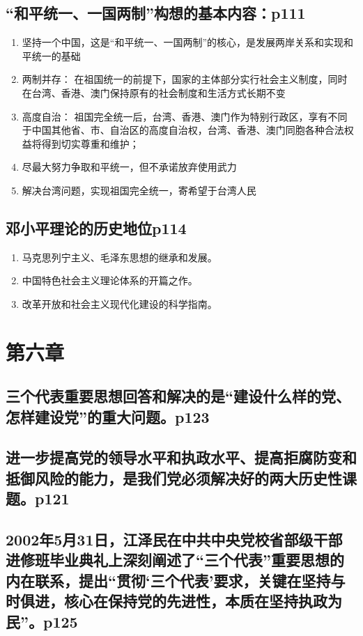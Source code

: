 \documentclass[UTF8]{ctexart}
\begin{document}
\subsection{“和平统一、一国两制”构想的基本内容：p111}
\begin{enumerate}[(1)]
    \item 坚持一个中国，这是“和平统一、一国两制”的核心，是发展两岸关系和实现和平统一的基础
    \item 两制并存： 在祖国统一的前提下，国家的主体部分实行社会主义制度，同时在台湾、香港、澳门保持原有的社会制度和生活方式长期不变
    \item 高度自治： 祖国完全统一后，台湾、香港、澳门作为特别行政区，享有不同于中国其他省、市、自治区的高度自治权，台湾、香港、澳门同胞各种合法权益将得到切实尊重和维护； 
    \item 尽最大努力争取和平统一，但不承诺放弃使用武力
    \item 解决台湾问题，实现祖国完全统一，寄希望于台湾人民
\end{enumerate}
\subsection{邓小平理论的历史地位p114}
\begin{enumerate}[(1)]
    \item 马克思列宁主义、毛泽东思想的继承和发展。
    \item 中国特色社会主义理论体系的开篇之作。
    \item 改革开放和社会主义现代化建设的科学指南。
\end{enumerate}
\section{第六章}
\subsection{三个代表重要思想回答和解决的是“建设什么样的党、怎样建设党”的重大问题。p123}
\subsection{进一步提高党的领导水平和执政水平、提高拒腐防变和抵御风险的能力，是我们党必须解决好的两大历史性课题。p121}
\subsection{2002年5月31日，江泽民在中共中央党校省部级干部进修班毕业典礼上深刻阐述了“三个代表”重要思想的内在联系，提出“贯彻‘三个代表’要求，关键在坚持与时俱进，核心在保持党的先进性，本质在坚持执政为民”。p125}
\end{document}
